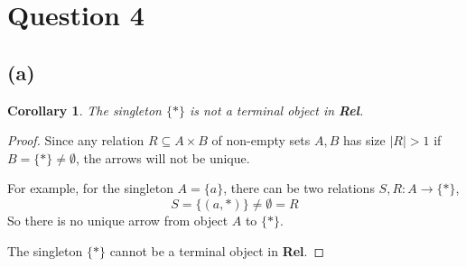 \documentclass[11pt]{article} %
\newtheorem{corollary}[theorem]{Corollary}
\theoremstyle{definition}
\begin{document}
\clearpage
\section*{Question 4}
\addtocounter{section}{1}
\subsection*{(a)}
\begin{corollary}
  The singleton $\{*\}$ is not a terminal object in \textbf{Rel}.
\end{corollary}
\begin{proof}
Since any relation $R\subseteq A\times B$ of non-empty sets $A,B$ has size $|R|>1$ if $B=\{*\}\neq \emptyset$,
the arrows will not be unique.

For example, for the singleton $A=\{a\}$, there can be two relations $S,R:A\rightarrow \{*\}$,
\[S=\{(a,*)\}\neq \emptyset= R\]
So there is no unique arrow from object $A$ to $\{*\}$.

The singleton $\{*\}$ cannot be a terminal object in \textbf{Rel}.
\end{proof}
\end{document}
